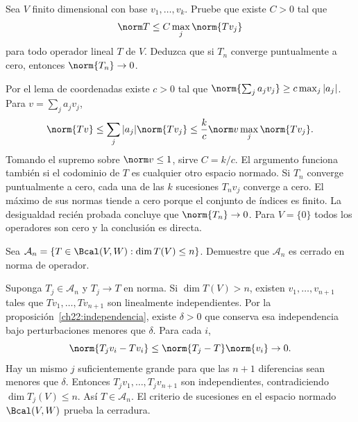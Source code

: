 \begin{ejercicio}
Sea $V$ finito dimensional con base $v_1,\ldots,v_k$. Pruebe que existe $C>0$ tal que
\[
 \norm T\leq C\max_j\norm{Tv_j}
\]
para todo operador lineal $T$ de $V$. Deduzca que si $T_n$ converge puntualmente a cero, entonces $\norm{T_n}\to0$.
\end{ejercicio}
\begin{solucion}
Por el lema de coordenadas existe $c>0$ tal que $\norm{\sum_j a_jv_j}\geq c\max_j|a_j|$. Para $v=\sum_j a_jv_j$,
\[
 \norm{Tv}\leq\sum_j|a_j|\norm{Tv_j}
 \leq\frac kc\norm v\max_j\norm{Tv_j}.
\]
Tomando el supremo sobre $\norm v\leq1$, sirve $C=k/c$. El argumento funciona también si el codominio de $T$ es cualquier otro espacio normado. Si $T_n$ converge puntualmente a cero, cada una de las $k$ sucesiones $T_nv_j$ converge a cero. El máximo de sus normas tiende a cero porque el conjunto de índices es finito. La desigualdad recién probada concluye que $\norm{T_n}\to0$. Para $V=\{0\}$ todos los operadores son cero y la conclusión es directa.
\end{solucion}

\begin{ejercicio}
Sea $\mathcal A_n=\{T\in\Bcal(V,W):\dim T(V)\leq n\}$. Demuestre que $\mathcal A_n$ es cerrado en norma de operador.
\end{ejercicio}
\begin{solucion}
Suponga $T_j\in\mathcal A_n$ y $T_j\to T$ en norma. Si $\dim T(V)>n$, existen $v_1,\ldots,v_{n+1}$ tales que $Tv_1,\ldots,Tv_{n+1}$ son linealmente independientes. Por la proposición~\ref{ch22:independencia}, existe $\delta>0$ que conserva esa independencia bajo perturbaciones menores que $\delta$. Para cada $i$,
\[
 \norm{T_jv_i-Tv_i}\leq\norm{T_j-T}\norm{v_i}\to0.
\]
Hay un mismo $j$ suficientemente grande para que las $n+1$ diferencias sean menores que $\delta$. Entonces $T_jv_1,\ldots,T_jv_{n+1}$ son independientes, contradiciendo $\dim T_j(V)\leq n$. Así $T\in\mathcal A_n$. El criterio de sucesiones en el espacio normado $\Bcal(V,W)$ prueba la cerradura.
\end{solucion}

